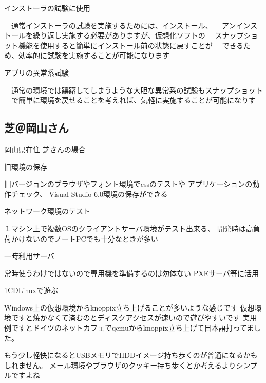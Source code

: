 \documentclass[cjk,dvipdfmx]{beamer}
\begin{document}
\begin{frame}
{インストーラの試験に使用}

 　通常インストーラの試験を実施するためには、インストール、
 　アンインストールを繰り返し実施する必要がありますが、仮想化ソフトの
 　スナップショット機能を使用すると簡単にインストール前の状態に戻すことが
 　できるため、効率的に試験を実施することが可能になります
\end{frame}

\begin{frame}
{アプリの異常系試験}

 　通常の環境では躊躇してしまうような大胆な異常系の試験もスナップショット
 　で簡単に環境を戻せることを考えれば、気軽に実施することが可能になりす
\end{frame}

\subsection{芝＠岡山さん}

\begin{frame}{}
岡山県在住 芝さんの場合
\end{frame}

\begin{frame}
{旧環境の保存}

 旧バージョンのブラウザやフォント環境でcssのテストや
 アプリケーションの動作チェック、
 Visual Studio 6.0環境の保存ができる
\end{frame}

\begin{frame}
{ネットワーク環境のテスト}

 １マシン上で複数OSのクライアントサーバ環境がテスト出来る、
 開発時は高負荷かけないのでノートPCでも十分なときが多い
\end{frame}

\begin{frame}
{一時利用サーバ}

 常時使うわけではないので専用機を準備するのは勿体ない
 PXEサーバ等に活用
\end{frame}

\begin{frame}
{1CDLinuxで遊ぶ}

 Windows上の仮想環境からknoppix立ち上げることが多いような感じです
 仮想環境ですと焼かなくて済むのとディスクアクセスが速いので遊びやすいです
 実用例ですとドイツのネットカフェでqemuからknoppix立ち上げて日本語打ってました。

もう少し軽快になるとUSBメモリでHDDイメージ持ち歩くのが普通になるかもしれません。
メール環境やブラウザのクッキー持ち歩くとか考えるよりシンプルですよね

\end{frame}
\end{document}
